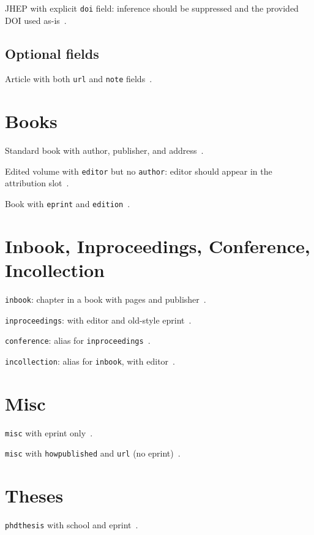 \documentclass[12pt]{article}
\begin{document}
JHEP with explicit \texttt{doi} field: inference should be suppressed and the provided DOI used as-is~\cite{jhep_explicit_doi}.

\subsection{Optional fields}

Article with both \texttt{url} and \texttt{note} fields~\cite{with_url_note}.

\section{Books}

Standard book with author, publisher, and address~\cite{book_author}.

Edited volume with \texttt{editor} but no \texttt{author}: editor should appear in the attribution slot~\cite{book_editor}.

Book with \texttt{eprint} and \texttt{edition}~\cite{book_eprint}.

\section{Inbook, Inproceedings, Conference, Incollection}

\texttt{inbook}: chapter in a book with pages and publisher~\cite{inbook_example}.

\texttt{inproceedings}: with editor and old-style eprint~\cite{inproceedings_example}.

\texttt{conference}: alias for \texttt{inproceedings}~\cite{conference_example}.

\texttt{incollection}: alias for \texttt{inbook}, with editor~\cite{incollection_example}.

\section{Misc}

\texttt{misc} with eprint only~\cite{misc_preprint}.

\texttt{misc} with \texttt{howpublished} and \texttt{url} (no eprint)~\cite{misc_howpublished}.

\section{Theses}

\texttt{phdthesis} with school and eprint~\cite{phdthesis_full}.
\end{document}

